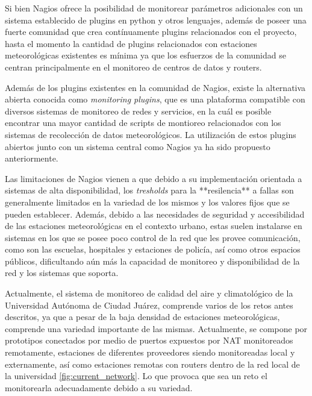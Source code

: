 Si bien Nagios ofrece la posibilidad de monitorear parámetros adicionales con un sistema establecido de plugins en python y otros lenguajes, además de poseer una fuerte comunidad que crea contínuamente plugins relacionados con el proyecto, hasta el momento la cantidad de plugins relacionados con estaciones meteorológicas existentes es mínima ya que los esfuerzos de la comunidad se centran principalmente en el monitoreo de centros de datos y routers.

Además de los plugins existentes en la comunidad de Nagios, existe la alternativa abierta conocida como \textit{monitoring plugins}\cite{monitoring_plugins}, que es una plataforma compatible con diversos sistemas de monitoreo de redes y servicios, en la cuál es posible encontrar una mayor cantidad de scripts de montioreo relacionados con los sistemas de recolección de datos meteorológicos. La utilización de estos plugins abiertos junto con un sistema central como Nagios ya ha sido propuesto anteriormente\cite{monitoreo_raspberry_nagios}.

Las limitaciones de Nagios vienen a que debido a su implementación orientada a sistemas de alta disponibilidad, los \textit{tresholds} para la **resilencia** a fallas son generalmente limitados en la variedad de los mismos y los valores fijos que se pueden establecer. Además, debido a las necesidades de seguridad y accesibilidad de las estaciones meteorológicas en el contexto urbano, estas suelen instalarse en sistemas en los que se posee poco control de la red que les provee comunicación, como son las escuelas, hospitales y estaciones de policía, así como otros espacios públicos\cite{muller_sensors_and_the_city}, dificultando aún más la capacidad de monitoreo y disponibilidad de la red y los sistemas que soporta.




Actualmente, el sistema de monitoreo de calidad del aire y climatológico de la Universidad Autónoma de Ciudad Juárez, comprende varios de los retos antes descritos, ya que a pesar de la baja densidad de estaciones meteorológicas, comprende una variedad importante de las mismas. Actualmente, se compone por prototipos conectados por medio de puertos expuestos por NAT monitoreados remotamente\cite{red_climatologica_uacj}, estaciones de diferentes proveedores siendo monitoreadas local y externamente, así como estaciones remotas con routers dentro de la red local de la universidad \ref{fig:current_network}. Lo que provoca que sea un reto el monitorearla adecuadamente debido a su variedad.

